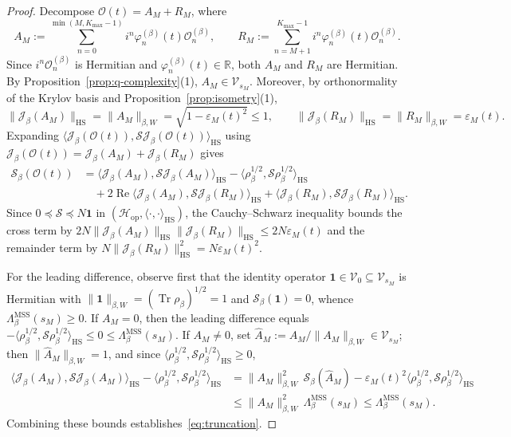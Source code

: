 \documentclass[11pt,a4paper]{article}
\numberwithin{equation}{section}
\theoremstyle{plain}
\theoremstyle{definition}
\newcommand{\Hop}{\mathcal{H}_{\mathrm{op}}}
\newcommand{\HS}{\mathrm{HS}}
\newcommand{\MSS}{\mathrm{MSS}}
\newcommand{\Tr}{\operatorname{Tr}}
\begin{document}
\begin{proof}
Decompose $\mathcal{O}(t) = A_M + R_M$, where
\[
  A_M := \sum_{n=0}^{\min(M,K_{\max}-1)} i^n\varphi_n^{(\beta)}(t)\mathcal{O}_n^{(\beta)}, \qquad
  R_M := \sum_{n=M+1}^{K_{\max}-1} i^n\varphi_n^{(\beta)}(t)\mathcal{O}_n^{(\beta)}.
\]
Since $i^n\mathcal{O}_n^{(\beta)}$ is Hermitian and $\varphi_n^{(\beta)}(t)\in\mathbb{R}$, both $A_M$ and $R_M$ are Hermitian. By Proposition~\ref{prop:q-complexity}(1), $A_M\in\mathcal{V}_{s_M}$. Moreover, by orthonormality of the Krylov basis and Proposition~\ref{prop:isometry}(1),
\[
  \|\mathcal{J}_\beta(A_M)\|_\HS = \|A_M\|_{\beta,W} = \sqrt{1-\varepsilon_M(t)^2} \le 1, \qquad
  \|\mathcal{J}_\beta(R_M)\|_\HS = \|R_M\|_{\beta,W} = \varepsilon_M(t).
\]
Expanding $\langle\mathcal{J}_\beta(\mathcal{O}(t)),\mathcal{S}\mathcal{J}_\beta(\mathcal{O}(t))\rangle_\HS$ using $\mathcal{J}_\beta(\mathcal{O}(t)) = \mathcal{J}_\beta(A_M) + \mathcal{J}_\beta(R_M)$ gives
\begin{align*}
  \mathcal{S}_\beta(\mathcal{O}(t))
  &= \langle\mathcal{J}_\beta(A_M),\mathcal{S}\mathcal{J}_\beta(A_M)\rangle_\HS - \langle\rho_\beta^{1/2},\mathcal{S}\rho_\beta^{1/2}\rangle_\HS \\
  &\quad + 2\operatorname{Re}\langle\mathcal{J}_\beta(A_M),\mathcal{S}\mathcal{J}_\beta(R_M)\rangle_\HS
    + \langle\mathcal{J}_\beta(R_M),\mathcal{S}\mathcal{J}_\beta(R_M)\rangle_\HS.
\end{align*}
Since $0\preceq\mathcal{S}\preceq N\mathbf{1}$ in $(\Hop,\langle\cdot,\cdot\rangle_\HS)$, the Cauchy--Schwarz inequality bounds the cross term by $2N\|\mathcal{J}_\beta(A_M)\|_\HS\|\mathcal{J}_\beta(R_M)\|_\HS \le 2N\varepsilon_M(t)$ and the remainder term by $N\|\mathcal{J}_\beta(R_M)\|_\HS^2 = N\varepsilon_M(t)^2$.

For the leading difference, observe first that the identity operator $\mathbf{1}\in\mathcal{V}_0\subseteq\mathcal{V}_{s_M}$ is Hermitian with $\|\mathbf{1}\|_{\beta,W} = (\Tr\rho_\beta)^{1/2} = 1$ and $\mathcal{S}_\beta(\mathbf{1}) = 0$, whence $\Lambda_\beta^{\MSS}(s_M)\ge 0$. If $A_M = 0$, then the leading difference equals $-\langle\rho_\beta^{1/2},\mathcal{S}\rho_\beta^{1/2}\rangle_\HS \le 0 \le \Lambda_\beta^{\MSS}(s_M)$. If $A_M\ne 0$, set $\widehat{A}_M := A_M/\|A_M\|_{\beta,W} \in \mathcal{V}_{s_M}$; then $\|\widehat{A}_M\|_{\beta,W}=1$, and since $\langle\rho_\beta^{1/2},\mathcal{S}\rho_\beta^{1/2}\rangle_\HS \ge 0$,
\begin{align*}
  \langle\mathcal{J}_\beta(A_M),\mathcal{S}\mathcal{J}_\beta(A_M)\rangle_\HS - \langle\rho_\beta^{1/2},\mathcal{S}\rho_\beta^{1/2}\rangle_\HS
  &= \|A_M\|_{\beta,W}^2\,\mathcal{S}_\beta(\widehat{A}_M) - \varepsilon_M(t)^2\langle\rho_\beta^{1/2},\mathcal{S}\rho_\beta^{1/2}\rangle_\HS \\
  &\le \|A_M\|_{\beta,W}^2\,\Lambda_\beta^{\MSS}(s_M) \le \Lambda_\beta^{\MSS}(s_M).
\end{align*}
Combining these bounds establishes~\eqref{eq:truncation}.
\end{proof}
\end{document}
